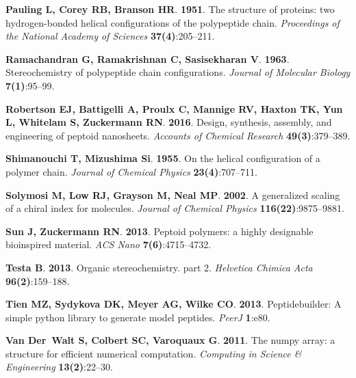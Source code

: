 \documentclass[fleqn,10pt,lineno]{wlpeerj} %
\begin{document}
\begin{thebibliography}{60}
\textbf{Pauling L, Corey RB, Branson HR}. \textbf{1951}.
\newblock The structure of proteins: two hydrogen-bonded helical configurations
  of the polypeptide chain.
\newblock \emph{Proceedings of the National Academy of Sciences}
  \textbf{37(4)}:205--211.

\textbf{Ramachandran G, Ramakrishnan C, Sasisekharan V}. \textbf{1963}.
\newblock Stereochemistry of polypeptide chain configurations.
\newblock \emph{Journal of Molecular Biology} \textbf{7(1)}:95--99.

\textbf{Robertson EJ, Battigelli A, Proulx C, Mannige RV, Haxton TK, Yun L,
  Whitelam S, Zuckermann RN}. \textbf{2016}.
\newblock Design, synthesis, assembly, and engineering of peptoid nanosheets.
\newblock \emph{Accounts of Chemical Research} \textbf{49(3)}:379--389.

\textbf{Shimanouchi T, Mizushima Si}. \textbf{1955}.
\newblock On the helical configuration of a polymer chain.
\newblock \emph{Journal of Chemical Physics} \textbf{23(4)}:707--711.

\textbf{Solymosi M, Low RJ, Grayson M, Neal MP}. \textbf{2002}.
\newblock A generalized scaling of a chiral index for molecules.
\newblock \emph{Journal of Chemical Physics} \textbf{116(22)}:9875--9881.

\textbf{Sun J, Zuckermann RN}. \textbf{2013}.
\newblock Peptoid polymers: a highly designable bioinspired material.
\newblock \emph{ACS Nano} \textbf{7(6)}:4715--4732.

\textbf{Testa B}. \textbf{2013}.
\newblock Organic stereochemistry. part 2.
\newblock \emph{Helvetica Chimica Acta} \textbf{96(2)}:159--188.

\textbf{Tien MZ, Sydykova DK, Meyer AG, Wilke CO}. \textbf{2013}.
\newblock Peptidebuilder: A simple python library to generate model peptides.
\newblock \emph{PeerJ} \textbf{1}:e80.

\textbf{Van Der~Walt S, Colbert SC, Varoquaux G}. \textbf{2011}.
\newblock The numpy array: a structure for efficient numerical computation.
\newblock \emph{Computing in Science \& Engineering} \textbf{13(2)}:22--30.


\end{thebibliography}
\end{document}
